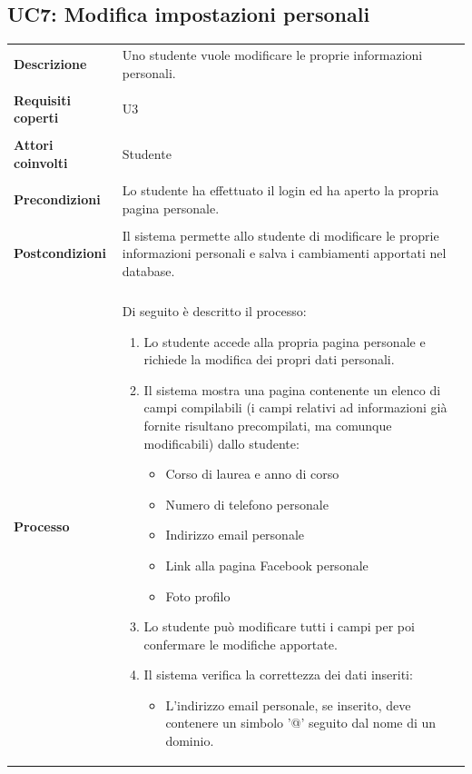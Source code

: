 \documentclass[10pt,a4paper]{report}
\begin{document}
	\subsection{UC7: Modifica impostazioni personali}
	\begin{tabular}{lp{}}
		\textbf{Descrizione}&Uno studente vuole modificare le proprie informazioni personali.\\
		\\
		\textbf{Requisiti coperti}&U3\\
		\\
		\textbf{Attori coinvolti}&Studente\\
		\\
		\textbf{Precondizioni}&Lo studente ha effettuato il login ed ha aperto la propria pagina personale.\\
		\\
		\textbf{Postcondizioni}&Il sistema permette allo studente di modificare le proprie informazioni personali e salva i cambiamenti apportati nel database.\\
		\\
		\textbf{Processo}&Di seguito è descritto il processo:
		\begin{enumerate}
			\item Lo studente accede alla propria pagina personale e richiede la modifica dei propri dati personali.
			\item Il sistema mostra una pagina contenente un elenco di campi compilabili (i campi relativi ad informazioni già fornite risultano precompilati, ma comunque modificabili) dallo studente:
			\begin{itemize}
				\item Corso di laurea e anno di corso
				\item Numero di telefono personale
				\item Indirizzo email personale
				\item Link alla pagina Facebook personale
				\item Foto profilo
			\end{itemize}
			\item Lo studente può modificare tutti i campi per poi confermare le modifiche apportate.
			\item Il sistema verifica la correttezza dei dati inseriti:
			\begin{itemize}
				\item L'indirizzo email personale, se inserito, deve contenere un simbolo '@' seguito dal nome di un dominio.
			\end{itemize}

\end{enumerate}
\end{tabular}
\end{document}
